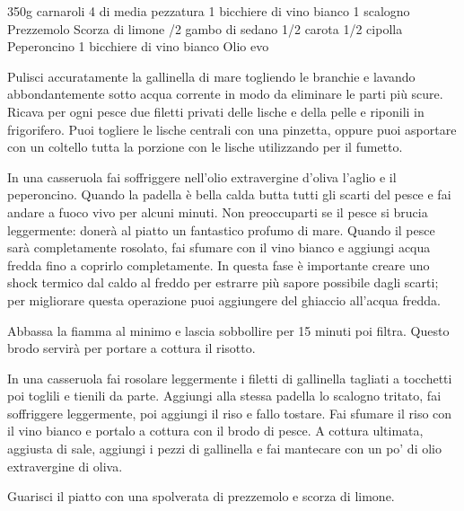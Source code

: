 \begin{ingreds}
	350g  carnaroli
	4  di media pezzatura
	1 bicchiere di vino bianco
	1 scalogno
	Prezzemolo
	Scorza di limone
\columnbreak
{}/2 gambo di sedano
	1/2 carota
	1/2 cipolla
	Peperoncino
	1 bicchiere di vino bianco
	Olio evo 

\end{ingreds}

\begin{method}
	Pulisci accuratamente la gallinella di mare togliendo le branchie e lavando abbondantemente sotto acqua corrente in modo da eliminare le parti più scure. Ricava per ogni pesce due filetti privati delle lische e della pelle e riponili in frigorifero. Puoi togliere le lische centrali con una pinzetta, oppure puoi  asportare con un coltello tutta la porzione con le lische utilizzando per il fumetto.

	In una casseruola fai soffriggere nell'olio extravergine d’oliva l'aglio e il peperoncino. Quando la padella è bella calda butta tutti gli scarti del pesce e fai andare a fuoco vivo per alcuni minuti. Non preoccuparti se il pesce si brucia leggermente: donerà al piatto un fantastico profumo di mare. Quando il pesce sarà completamente rosolato, fai sfumare con il vino bianco e aggiungi acqua fredda fino a coprirlo completamente. In questa fase è importante creare uno shock termico dal caldo al freddo per estrarre più sapore possibile dagli scarti; per migliorare questa operazione puoi aggiungere del ghiaccio all'acqua fredda.
	
	Abbassa la fiamma al minimo e lascia sobbollire per 15 minuti poi filtra. Questo brodo servirà per portare a cottura il risotto.

	In una casseruola fai rosolare leggermente i filetti di gallinella tagliati a tocchetti poi toglili e tienili da parte. Aggiungi alla stessa padella lo scalogno tritato, fai soffriggere leggermente, poi aggiungi il riso e fallo tostare. Fai sfumare il riso con il vino bianco e portalo a cottura con il brodo di pesce. A cottura ultimata, aggiusta di sale, aggiungi i pezzi di gallinella e fai mantecare con un po’ di olio extravergine di oliva.

	Guarisci il piatto con una spolverata di prezzemolo e scorza di limone.

\end {method}

